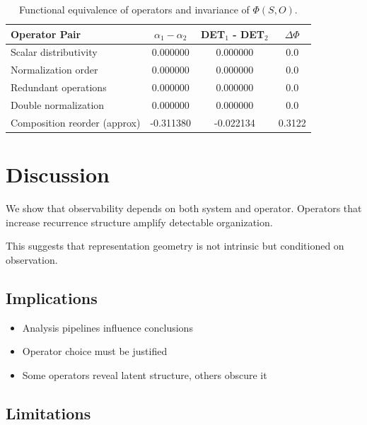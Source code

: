\documentclass[11pt]{article}
\begin{document}
\begin{table}[h]
	\centering
	\caption{Functional equivalence of operators and invariance of $\Phi(S,O)$.}
	\begin{tabular}{l c c c}
		\toprule
		Operator Pair                & $\alpha_1 - \alpha_2$ & DET$_1$ - DET$_2$ & $\Delta \Phi$ \\
		\midrule
		Scalar distributivity        & 0.000000              & 0.000000          & 0.0           \\
		Normalization order          & 0.000000              & 0.000000          & 0.0           \\
		Redundant operations         & 0.000000              & 0.000000          & 0.0           \\
		Double normalization         & 0.000000              & 0.000000          & 0.0           \\
		Composition reorder (approx) & -0.311380             & -0.022134         & 0.3122        \\
		\bottomrule
	\end{tabular}
	\label{tab:invariance}
\end{table}

\section{Discussion}

We show that observability depends on both system and operator. Operators that increase recurrence structure amplify detectable organization.

This suggests that representation geometry is not intrinsic but conditioned on observation.

\subsection{Implications}

\begin{itemize}
	\item Analysis pipelines influence conclusions
	\item Operator choice must be justified
	\item Some operators reveal latent structure, others obscure it
\end{itemize}

\subsection{Limitations}
\end{document}
